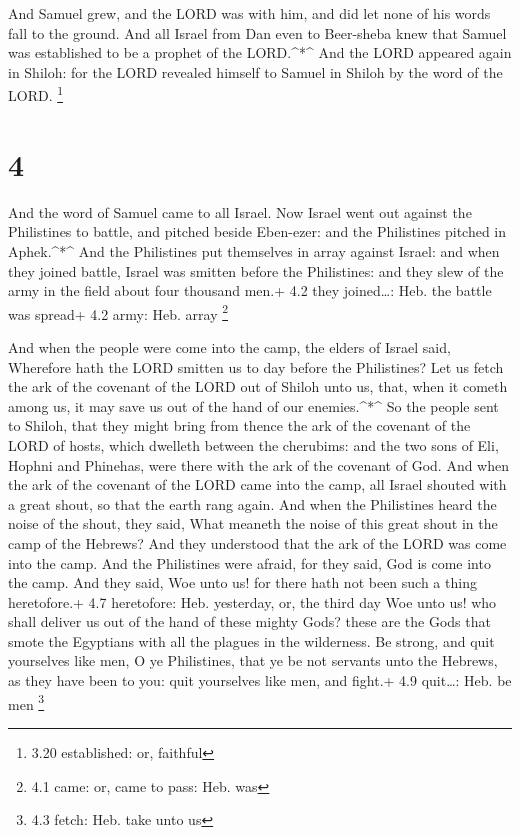  And Samuel grew, and the LORD was with him, and did let
none of his words fall to the ground.  And all Israel from
Dan even to Beer-sheba knew that Samuel was established to be a prophet
of the LORD.\^{}*\^{}  And the LORD appeared again in
Shiloh: for the LORD revealed himself to Samuel in Shiloh by the word of
the LORD. \footnote{3.20 established: or, faithful}

\hypertarget{section-3}{%
\section{4}\label{section-3}}

 And the word of Samuel came to all Israel. Now Israel went
out against the Philistines to battle, and pitched beside Eben-ezer: and
the Philistines pitched in Aphek.\^{}*\^{}  And the
Philistines put themselves in array against Israel: and when they joined
battle, Israel was smitten before the Philistines: and they slew of the
army in the field about four thousand men.+ 4.2 they joined\ldots: Heb.
the battle was spread+ 4.2 army: Heb. array \footnote{4.1 came: or, came
  to pass: Heb. was}

 And when the people were come into the camp, the elders of
Israel said, Wherefore hath the LORD smitten us to day before the
Philistines? Let us fetch the ark of the covenant of the LORD out of
Shiloh unto us, that, when it cometh among us, it may save us out of the
hand of our enemies.\^{}*\^{}  So the people sent to Shiloh,
that they might bring from thence the ark of the covenant of the LORD of
hosts, which dwelleth between the cherubims: and the two sons of Eli,
Hophni and Phinehas, were there with the ark of the covenant of God.
 And when the ark of the covenant of the LORD came into the
camp, all Israel shouted with a great shout, so that the earth rang
again.  And when the Philistines heard the noise of the
shout, they said, What meaneth the noise of this great shout in the camp
of the Hebrews? And they understood that the ark of the LORD was come
into the camp.  And the Philistines were afraid, for they
said, God is come into the camp. And they said, Woe unto us! for there
hath not been such a thing heretofore.+ 4.7 heretofore: Heb. yesterday,
or, the third day  Woe unto us! who shall deliver us out of
the hand of these mighty Gods? these are the Gods that smote the
Egyptians with all the plagues in the wilderness.  Be
strong, and quit yourselves like men, O ye Philistines, that ye be not
servants unto the Hebrews, as they have been to you: quit yourselves
like men, and fight.+ 4.9 quit\ldots: Heb. be men \footnote{4.3 fetch:
  Heb. take unto us}

